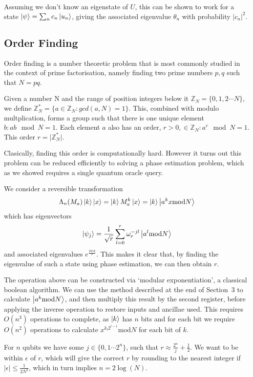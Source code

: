 \documentclass[11pt]{article}
\begin{document}
Assuming we don't know an eigenstate of $U$, this can be shown to work for a state $\ket{\psi}=\sum_{n}c_{n}\ket{u_{n}}$, giving the associated eigenvalue $\theta_{n}$ with probability $\vert c_{n}\vert^{2}$.
\subsection*{Order Finding}
Order finding is a number theoretic problem that is most commonly studied in the context of prime factorisation, namely finding two prime numbers $p,q$ such that $N=pq$.

Given a number N and the range of position integers below it $\mathbb{Z}_{N}=\{0,1,2\cdots N\}$, we define $\mathbb{Z}_{N}^{*}=\{a\in \mathbb{Z}_{N} : gcd(a,N) = 1\}$. This, combined with modulo multplication, forms a group such that there is one unique element $b: ab\mod N = 1$. Each element $a$ also has an order, $r>0,\in \mathbb{Z}_{N} : a^{r}\mod N = 1$. This order $r=\vert \mathbb{Z}_{N}^{*}\vert$.

Clasically, finding this order is computationally hard. However it turns out this problem can be reduced efficiently to solving  a phase estimation problem, which as we showed requires a single quantum oracle query.

We consider a reversible transformation
\[\Lambda_{n}(M_{a})\ket{k}\ket{x}=\ket{k}M_{a}^{k}\ket{x}= \ket{k}\ket{a^{k}x\text{mod} N}\]
which has eigenvectors
\begin{equation}
    \ket{\psi_{j}} = \frac{1}{\sqrt{r}}\sum_{l=0}^{r}\omega_{r}^{-jl}\ket{a^{l}\text{mod} N}
\end{equation}
and associated eigenvalues $e^{\frac{2\pi i k}{r}}$. This makes it clear that, by finding the eigenvalue of such a state using phase estimation, we can then obtain $r$.

The operation above can be constructed via `modular exponentiation', a classical boolean algorithm. We can use the method described at the end of Section~3 to calculate $\ket{a^{k}\text{mod}N}$, and then multiply this result by the second register, before applying the inverse operation to restore inputs and ancillae used. This requires $O(n^{3})$ operations to complete, as $\ket{k}$ has $n$ bits and for each bit we require $O(n^{2})$ operations to calculate $x^{k_{l}2^{l-1}}\text{mod}N$ for each bit of $k$.

For $n$ qubits we have some $j\in\{0,1\cdots 2^{n}\}$, such that $r \approx \frac{2^{n}}{j}+\frac{1}{2}$. We want to be within $\epsilon$ of $r$, which will give the correct $r$ by rounding to the nearest integer if $\vert\epsilon\vert \leq \frac{1}{2N^{2}}$, which in turn implies $n= 2\log(N)$.
\end{document}
